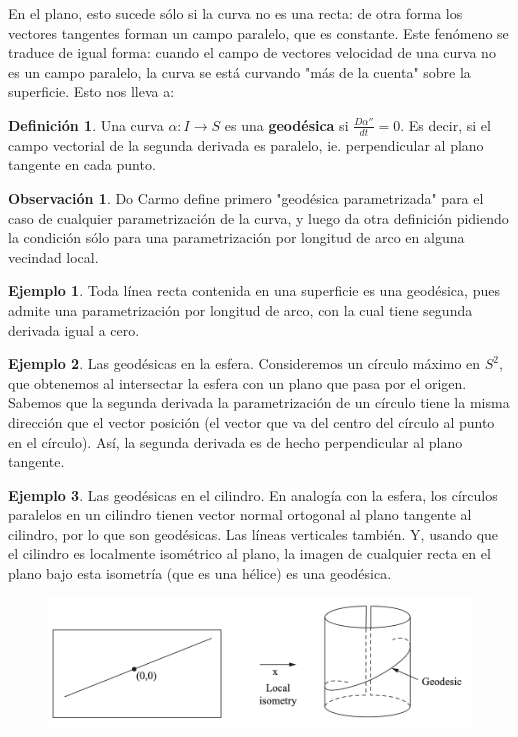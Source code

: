 \documentclass[spanish]{book}
\theoremstyle{definition}
\newtheorem*{defn}{Definición}
\newtheorem*{obs}{Observación}
\newtheorem*{ejem}{Ejemplo}
\begin{document}
En el plano, esto sucede sólo si la curva no es una recta: de otra forma los vectores tangentes forman un campo paralelo, que es constante. Este fenómeno se traduce de igual forma: cuando el campo de vectores velocidad de una curva no es un campo paralelo, la curva se está curvando "más de la cuenta" sobre la superficie. Esto nos lleva a:
\begin{defn}
	Una curva $\alpha:I\to S$ es una \textbf{geodésica}  si $\frac{D\alpha''}{dt}=0$. Es decir, si el campo vectorial de la segunda derivada es paralelo, ie. perpendicular al plano tangente en cada punto.
\end{defn}
\begin{obs}
	Do Carmo define primero "geodésica parametrizada" para el caso de cualquier parametrización de la curva, y luego da otra definición pidiendo la condición sólo para una parametrización por longitud de arco en alguna vecindad local.
\end{obs}
\begin{ejem}
	Toda línea recta contenida en una superficie es una geodésica, pues admite una parametrización por longitud de arco, con la cual tiene segunda derivada igual a cero.
\end{ejem}
\begin{ejem}
	Las geodésicas en la esfera. Consideremos un círculo máximo en $S^2$, que obtenemos al intersectar la esfera con un plano que pasa por el origen. Sabemos que la segunda derivada la parametrización de un círculo tiene la misma dirección que el vector posición (el vector que va del centro del círculo al punto en el círculo). Así, la segunda derivada es de hecho perpendicular al plano tangente.
\end{ejem}
\begin{ejem}
	Las geodésicas en el cilindro. En analogía con la esfera, los círculos paralelos en un cilindro tienen vector normal ortogonal al plano tangente al cilindro, por lo que son geodésicas. Las líneas verticales también. Y, usando que el cilindro es localmente isométrico al plano, la imagen de cualquier recta en el plano bajo esta isometría (que es una hélice) es una geodésica.
\end{ejem}
\begin{figure}[H]
	\centering
	\includegraphics[width=\linewidth]{gauss12}
\end{figure}
\end{document}
